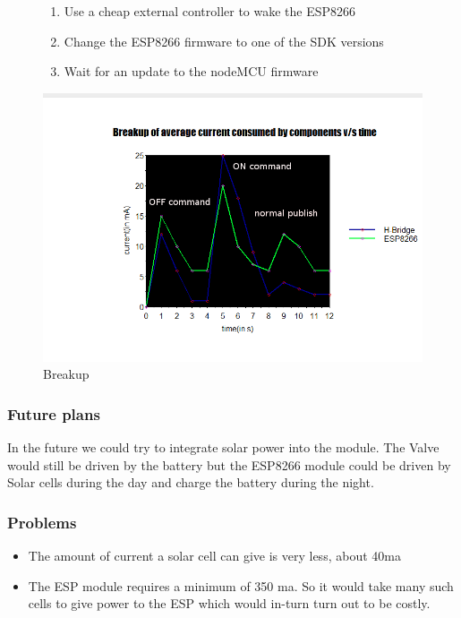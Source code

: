 \documentclass[16pt]{article}
\begin{document}
\begin{figure}
\begin{enumerate}

\item
  Use a cheap external controller to wake the ESP8266
\item
  Change the ESP8266 firmware to one of the SDK versions
\item
  Wait for an update to the nodeMCU firmware
\end{enumerate}
\includegraphics[width=1.2\textwidth]{images/breakup1.png}
\caption{Breakup}
\end{figure}
  



\vspace{0.5cm}
\subsubsection{Future plans}

\vspace{0.3cm}
In the future we could try to integrate solar power into the module. The
Valve would still be driven by the battery but the ESP8266 module could
be driven by Solar cells during the day and charge the battery during
the night.

\vspace{0.3cm}

\subsubsection{Problems}

\begin{itemize}

\item
  The amount of current a solar cell can give is very less, about 40ma
\item
  The ESP module requires a minimum of 350 ma. So it would take many
  such cells to give power to the ESP which would in-turn turn out to be
  costly.
\end{itemize}
\end{document}

